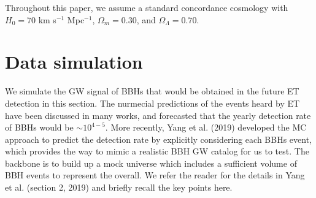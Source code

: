 \documentclass[twocolumn]{aastex62}
\begin{document}
Throughout this paper, we assume a standard concordance cosmology with $H_0= 70$ km s$^{-1}$ Mpc$^{-1}$, $\Omega{_m} = 0.30$, and $\Omega{_\Lambda} = 0.70$.

\section{Data simulation} \label{sec_simulation}
We simulate the GW signal of BBHs that would be obtained in the future ET detection in this section. The nurmecial predictions of the events heard by ET have been discussed in many works, and forecasted that the yearly detection rate of BBHs would be $\sim10^{4-5}.$ More recently, Yang et al. (2019) developed the MC approach to predict the detection rate by explicitly considering each BBHs event, which provides the way to mimic a realistic BBH GW catalog for us to test. The backbone is to build up a mock universe which includes a sufficient volume of BBH events to represent the overall.  We refer the reader for the details in Yang et al. (section 2, 2019) and briefly recall the key points here.
\end{document}
